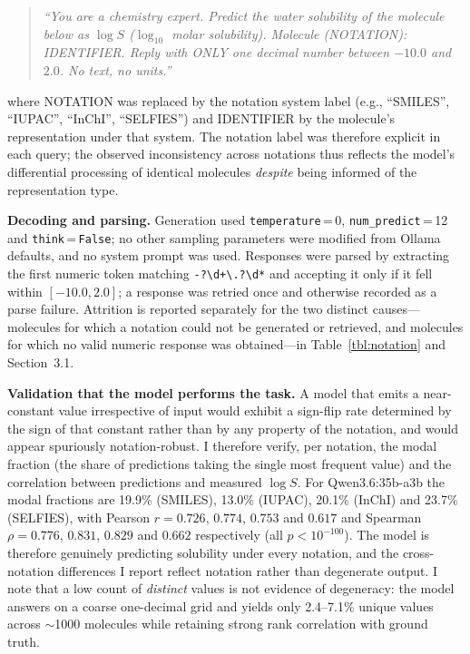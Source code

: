 \documentclass[twoside,twocolumn,9pt]{article}
\newcommand{\logS}{\ensuremath{\log S}}
\begin{document}
\begin{quote}\small
\textit{``You are a chemistry expert. Predict the water solubility of the molecule below as $\log S$ ($\log_{10}$ molar solubility). Molecule (NOTATION): IDENTIFIER. Reply with ONLY one decimal number between $-10.0$ and $2.0$. No text, no units.''}
\end{quote}

\noindent where NOTATION was replaced by the notation system label (e.g., ``SMILES'', ``IUPAC'', ``InChI'', ``SELFIES'') and IDENTIFIER by the molecule's representation under that system. The notation label was therefore explicit in each query; the observed inconsistency across notations thus reflects the model's differential processing of identical molecules \textit{despite} being informed of the representation type.

\textbf{Decoding and parsing.} Generation used \texttt{temperature}\,=\,0, \texttt{num\_predict}\,=\,12 and \texttt{think}\,=\,\texttt{False}; no other sampling parameters were modified from Ollama defaults, and no system prompt was used. Responses were parsed by extracting the first numeric token matching \texttt{-?\textbackslash d+\textbackslash.?\textbackslash d*} and accepting it only if it fell within $[-10.0, 2.0]$; a response was retried once and otherwise recorded as a parse failure. Attrition is reported separately for the two distinct causes---molecules for which a notation could not be generated or retrieved, and molecules for which no valid numeric response was obtained---in Table~\ref{tbl:notation} and Section~3.1.

\textbf{Validation that the model performs the task.} A model that emits a near-constant value irrespective of input would exhibit a sign-flip rate determined by the sign of that constant rather than by any property of the notation, and would appear spuriously notation-robust. I therefore verify, per notation, the modal fraction (the share of predictions taking the single most frequent value) and the correlation between predictions and measured $\logS$. For Qwen3.6:35b-a3b the modal fractions are 19.9\% (SMILES), 13.0\% (IUPAC), 20.1\% (InChI) and 23.7\% (SELFIES), with Pearson $r=0.726$, $0.774$, $0.753$ and $0.617$ and Spearman $\rho=0.776$, $0.831$, $0.829$ and $0.662$ respectively (all $p<10^{-100}$). The model is therefore genuinely predicting solubility under every notation, and the cross-notation differences I report reflect notation rather than degenerate output. I note that a low count of \textit{distinct} values is not evidence of degeneracy: the model answers on a coarse one-decimal grid and yields only 2.4--7.1\% unique values across $\sim$1000 molecules while retaining strong rank correlation with ground truth.
\end{document}
